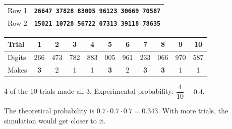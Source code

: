 \documentclass[11pt]{article}
\begin{document}
\vspace{0.4em}
\begin{center}
\renewcommand{\arraystretch}{1.3}{\large
\begin{tabular}{|l|l|}\hline
Row 1 & \texttt{\bfseries 26647 37828 83005 96123 30669 70587}\\
Row 2 & \texttt{\bfseries 15021 10728 56722 07313 39118 78635}\\ \hline
\end{tabular}}
\end{center}

\begin{center}
\renewcommand{\arraystretch}{1.3}
\setlength{\tabcolsep}{4pt}
\begin{tabular}{|l|c|c|c|c|c|c|c|c|c|c|}\hline
Trial & 1 & 2 & 3 & 4 & 5 & 6 & 7 & 8 & 9 & 10 \\ \hline
Digits & 266 & 473 & 782 & 883 & 005 & 961 & 233 & 066 & 970 & 587 \\ \hline
Makes & \textbf{3} & 2 & 1 & 1 & \textbf{3} & 2 & \textbf{3} & \textbf{3} & 1 & 1 \\ \hline
\end{tabular}
\end{center}

4 of the 10 trials made all 3. \; Experimental probability: $\dfrac{4}{10} = 0.4$.

\vspace{0.2em}
The theoretical probability is $0.7 \cdot 0.7 \cdot 0.7 = 0.343$. With more trials, the simulation would get closer to it.

\partner
\end{document}
